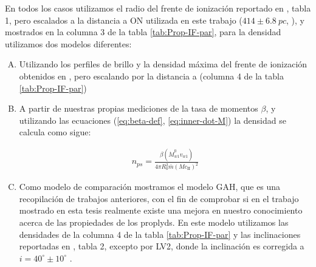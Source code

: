 En todos los casos utilizamos el radio del frente de ionización reportado en \citet{Garcia-Arredondo:2001}, tabla 1, pero escalados a la distancia a ON utilizada en este trabajo ($414 \pm \SI{6.8}{pc}$, \citet{Menten:2007}), y mostrados en la columna 3 de la tabla \ref{tab:Prop-IF-par}, para la densidad utilizamos dos modelos diferentes:

\begin{enumerate}[A.]
\item Utilizando los perfiles de brillo y la densidad máxima del frente de ionización obtenidos en \citet{Garcia-Arredondo:2001}, pero escalando por la distancia a \thC{} (columna 4 de la tabla \ref{tab:Prop-IF-par})
\item A partir de nuestras propias mediciones de la tasa de momentos $\beta$, y utilizando las ecuaciones (\ref{eq:beta-def}, \ref{eq:inner-dot-M}) la densidad se calcula como sigue:

  \begin{align}
    n_{ps} = \frac{\beta\left(\dot{M}^0_{w1}v_{w1}\right)}{4\pi R^2_0 \bar{m}\left(M c_{\mathrm{II}}\right)^2} \label{eq:b-density}
  \end{align}
\item Como modelo de comparación mostramos el modelo GAH, que es una recopilación de trabajos anteriores, con el fin de comprobar si en el trabajo mostrado en esta tesis realmente existe una mejora en nuestro conocimiento acerca de las propiedades de los proplyds. En este modelo utilizamos las densidades de la columna 4 de la tabla \ref{tab:Prop-IF-par} y las inclinaciones reportadas en \citet{HA:1998}, tabla 2, excepto por LV2, donde la inclinación es corregida a $i=40^\circ \pm 10^\circ$ \citep{Henney:2002, Garcia-Arredondo:2001}.
\end{enumerate}


